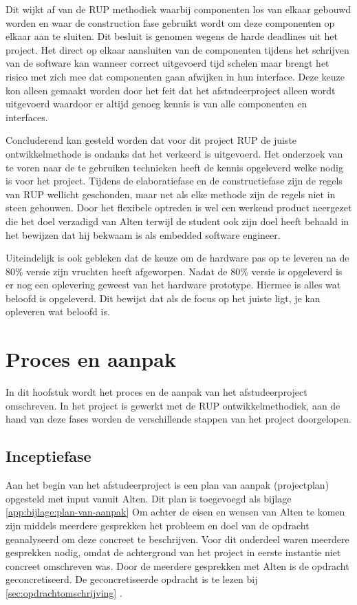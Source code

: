 \documentclass[a4paper, 11pt, oneside]{report}
\begin{document}
Dit wijkt af van de RUP methodiek waarbij componenten los van elkaar gebouwd worden en waar de construction fase gebruikt wordt om deze componenten op elkaar aan te sluiten. Dit besluit is genomen wegens de harde deadlines uit het project. Het direct op elkaar aansluiten van de componenten tijdens het schrijven van de software kan wanneer correct uitgevoerd tijd schelen maar brengt het risico met zich mee dat componenten gaan afwijken in hun interface. Deze keuze kon alleen gemaakt worden door het feit dat het afstudeerproject alleen wordt uitgevoerd waardoor er altijd genoeg kennis is van alle componenten en interfaces.

Concluderend kan gesteld worden dat voor dit project RUP de juiste ontwikkelmethode is ondanks dat het verkeerd is uitgevoerd. 
Het onderzoek van te voren naar de te gebruiken technieken heeft de kennis opgeleverd welke nodig is voor het project. Tijdens de elaboratiefase en de constructiefase zijn de regels van RUP wellicht geschonden, maar net als elke methode zijn de regels niet in steen gehouwen.
Door het flexibele optreden is wel een werkend product neergezet die het doel verzadigd van Alten terwijl de student ook zijn doel heeft behaald in het bewijzen dat hij bekwaam is als embedded software engineer. 

Uiteindelijk is ook gebleken dat de keuze om de hardware pas op te leveren na de 80\% versie zijn vruchten heeft afgeworpen.
Nadat de 80\% versie is opgeleverd is er nog een oplevering geweest van het hardware prototype.
Hiermee is alles wat beloofd is opgeleverd.
Dit bewijst dat als de focus op het juiste ligt, je kan opleveren wat beloofd is.
 

\chapter{Proces en aanpak}\label{sec:proces-en-aanpak}
In dit hoofstuk wordt het proces en de aanpak van het afstudeerproject omschreven.
In het project is gewerkt met de RUP ontwikkelmethodiek, aan de hand van deze fases worden de verschillende stappen van het project doorgelopen.

\section{Inceptiefase}\label{sec:inceptiefase}

Aan het begin van het afstudeerproject is een plan van aanpak (projectplan) opgesteld met input vanuit Alten.
Dit plan is toegevoegd als bijlage \ref{app:bijlage:plan-van-aanpak}
Om achter de eisen en wensen van Alten te komen zijn middels meerdere gesprekken het probleem en doel van de opdracht geanalyseerd om deze concreet te beschrijven.
Voor dit onderdeel waren meerdere gesprekken nodig, omdat de achtergrond van het project in eerste instantie niet concreet omschreven was.
Door de meerdere gesprekken met Alten is de opdracht geconcretiseerd. De geconcretiseerde opdracht is te lezen bij \autoref{sec:opdrachtomschrijving} .
\end{document}
